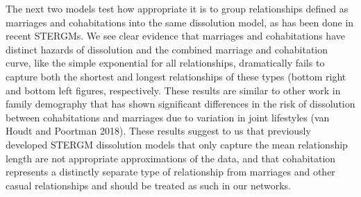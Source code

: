 \documentclass [11pt, proquest] {uwthesis}[2015/03/03]
\begin{document}
The next two models test how appropriate it is to group relationships
defined as marriages and cohabitations into the same dissolution model,
as has been done in recent STERGMs. We see clear evidence that marriages
and cohabitations have distinct hazards of dissolution and the combined
marriage and cohabitation curve, like the simple exponential for all
relationships, dramatically fails to capture both the shortest and
longest relationships of these types (bottom right and bottom left
figures, respectively. These results are similar to other work in family
demography that has shown significant differences in the risk of
dissolution between cohabitations and marriages due to variation in
joint lifestyles (van Houdt and Poortman 2018). These results suggest to
us that previously developed STERGM dissolution models that only capture
the mean relationship length are not appropriate approximations of the
data, and that cohabitation represents a distinctly separate type of
relationship from marriages and other casual relationships and should be
treated as such in our networks.
\end{document}

